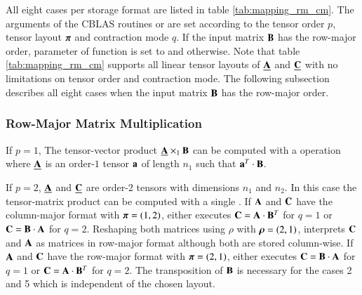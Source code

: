 All eight cases per storage format are listed in table \ref{tab:mapping_rm_cm}.
The arguments of the CBLAS routines  or  are set according to the tensor order $p$, tensor layout $\boldsymbol{\pi}$ and contraction mode $q$.
If the input matrix $\mathbf{B}$ has the row-major order, parameter  of function  is set to  and  otherwise.
Note that table \ref{tab:mapping_rm_cm} supports all linear tensor layouts of $\underline{\mathbf{A}}$ and $\underline{\mathbf{C}}$ with no limitations on tensor order and contraction mode.
The following subsection describes all eight cases when the input matrix $\mathbf{B}$ has the row-major order.




\subsubsection{Row-Major Matrix Multiplication}

If $p=1$, The tensor-vector product $\underline{\mathbf{A}} \times_1 \mathbf{B}$ can be computed with a  operation where $\underline{\mathbf{A}}$ is an order-$1$ tensor $\mathbf{a}$ of length $n_1$ such that $\mathbf{a}^T \cdot \mathbf{B}$.

If $p=2$, $\underline{\mathbf{A}}$ and $\underline{\mathbf{C}}$ are order-$2$ tensors with dimensions $n_1$ and $n_2$.
In this case the tensor-matrix product can be computed with a single .
If $\mathbf{A}$ and $\mathbf{C}$ have the column-major format with $\boldsymbol{\pi}=(1,2)$,  either executes $\mathbf{C} = \mathbf{A} \cdot \mathbf{B}^T$ for $q =1$ or $\mathbf{C} = \mathbf{B} \cdot \mathbf{A}$ for $q=2$.
Reshaping both matrices using $\rho$ with $\boldsymbol{\rho} = (2,1)$,  interprets $\mathbf{C}$ and $\mathbf{A}$ as matrices in row-major format although both are stored column-wise.
If $\mathbf{A}$ and $\mathbf{C}$ have the row-major format with $\boldsymbol{\pi}=(2,1)$,  either executes $\mathbf{C} = \mathbf{B} \cdot \mathbf{A}$ for $q =1$ or $\mathbf{C} = \mathbf{A} \cdot \mathbf{B}^T$ for $q=2$. 
The transposition of $\mathbf{B}$ is necessary for the cases 2 and 5 which is independent of the chosen layout.

